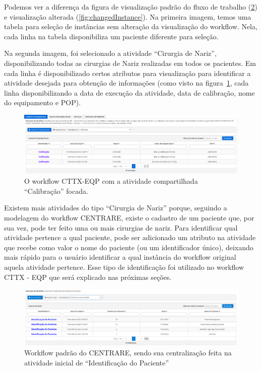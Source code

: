 Podemos ver a diferença da figura de visualização padrão do fluxo de trabalho (\ref{fig:normalInstance}) e visualização alterada (\ref{fig:changedInstance}). Na primeira imagem, temos uma tabela para seleção de instâncias sem alteração da visualização do workflow. Nela, cada linha na tabela disponibiliza um paciente diferente para seleção.

Na segunda imagem, foi selecionado a atividade ``Cirurgia de Nariz'', disponibilizando todas as cirurgias de Nariz realizadas em todos os pacientes. Em cada linha é disponibilizado certos atributos para visualização para identificar a atividade desejada para obtenção de informações (como visto na figura~\ref{fig:cttx_eqp_calibracao_focada}, cada linha disponibilizando a data de execução da atividade, data de calibração, nome do equipamento e POP).

\begin{figure}
    \centering
    \includegraphics[width=1\textwidth]{imgs/CTTX-EQP/cttx_eqp_calibracao_focada.png}
    \caption{O workflow CTTX-EQP com a atividade compartilhada ``Calibração'' focada.}
    \label{fig:cttx_eqp_calibracao_focada}
\end{figure}

Existem mais atividades do tipo ``Cirurgia de Nariz'' porque, seguindo a modelagem do workflow CENTRARE, existe o cadastro de um paciente que, por sua vez, pode ter feito uma ou mais cirurgias de nariz. Para identificar qual atividade pertence a qual paciente, pode ser adicionado um atributo na atividade que recebe como valor o nome do paciente (ou um identificador único), deixando mais rápido para o usuário identificar a qual instância do workflow original aquela atividade pertence. Esse tipo de identificação foi utilizado no workflow CTTX - EQP que será explicado nas próximas seções.

\begin{figure}
    \centering
    \includegraphics[width=1\textwidth]{imgs/CENTRARE/instanciaNormal.png}
    \caption{Workflow padrão do CENTRARE, sendo sua centralização feita na atividade inicial de ``Identificação do Paciente''}
    \label{fig:normalInstance}
\end{figure}

